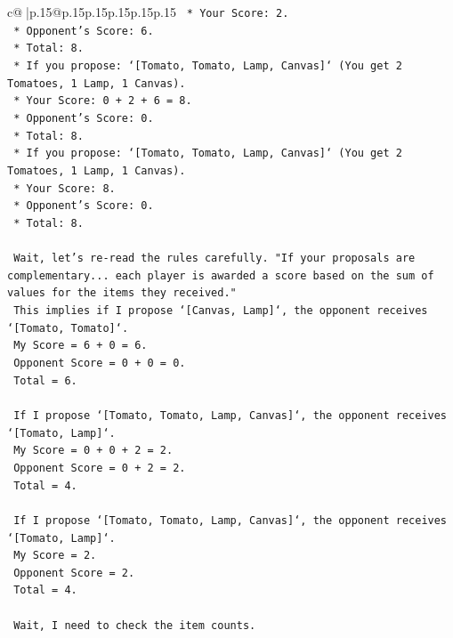\documentclass{article}
\begin{document}
{\begin{supertabular}{c@{$\;$}|p{.15\linewidth}@{}p{.15\linewidth}p{.15\linewidth}p{.15\linewidth}p{.15\linewidth}p{.15\linewidth}}
{{{\texttt{        *   Your Score: 2.} \\
\texttt{        *   Opponent's Score: 6.} \\
\texttt{        *   Total: 8.} \\
\texttt{    *   If you propose: `{[}Tomato, Tomato, Lamp, Canvas{]}` (You get 2 Tomatoes, 1 Lamp, 1 Canvas).} \\
\texttt{        *   Your Score: 0 + 2 + 6 = 8.} \\
\texttt{        *   Opponent's Score: 0.} \\
\texttt{        *   Total: 8.} \\
\texttt{    *   If you propose: `{[}Tomato, Tomato, Lamp, Canvas{]}` (You get 2 Tomatoes, 1 Lamp, 1 Canvas).} \\
\texttt{        *   Your Score: 8.} \\
\texttt{        *   Opponent's Score: 0.} \\
\texttt{        *   Total: 8.} \\
\\ 
\texttt{    Wait, let's re{-}read the rules carefully. "If your proposals are complementary... each player is awarded a score based on the sum of values for the items they received."} \\
\texttt{    This implies if I propose `{[}Canvas, Lamp{]}`, the opponent receives `{[}Tomato, Tomato{]}`.} \\
\texttt{    My Score = 6 + 0 = 6.} \\
\texttt{    Opponent Score = 0 + 0 = 0.} \\
\texttt{    Total = 6.} \\
\\ 
\texttt{    If I propose `{[}Tomato, Tomato, Lamp, Canvas{]}`, the opponent receives `{[}Tomato, Lamp{]}`.} \\
\texttt{    My Score = 0 + 0 + 2 = 2.} \\
\texttt{    Opponent Score = 0 + 2 = 2.} \\
\texttt{    Total = 4.} \\
\\ 
\texttt{    If I propose `{[}Tomato, Tomato, Lamp, Canvas{]}`, the opponent receives `{[}Tomato, Lamp{]}`.} \\
\texttt{    My Score = 2.} \\
\texttt{    Opponent Score = 2.} \\
\texttt{    Total = 4.} \\
\\ 
\texttt{    Wait, I need to check the item counts.} \\
}}}
\end{supertabular}}
\end{document}
